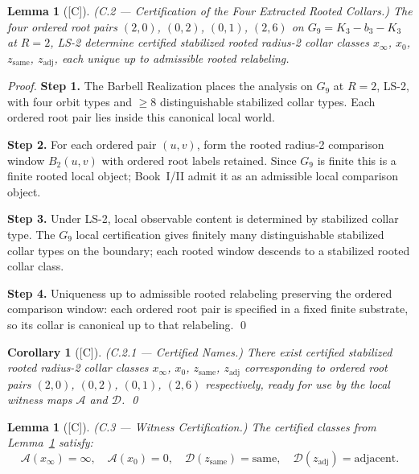 \documentclass[12pt,oneside]{amsbook}
\theoremstyle{plain}
\newtheorem{lemma}[theorem]{Lemma}
\newtheorem{corollary}[theorem]{Corollary}
\theoremstyle{definition}
\theoremstyle{remark}
\newcommand{\status}[1]{\textup{[#1]}}
\begin{document}
\begin{lemma}[\status{C}]\label{lem:C2-collar-cert}
\textup{(C.2 --- Certification of the Four Extracted Rooted Collars.)}
The four ordered root pairs
$(2,0)$, $(0,2)$, $(0,1)$, $(2,6)$
on $G_9 = K_3 - b_3 - K_3$ at $R=2$, LS-2 determine certified
stabilized rooted radius-2 collar classes
$x_\infty$, $x_0$, $z_{\mathrm{same}}$, $z_{\mathrm{adj}}$,
each unique up to admissible rooted relabeling.
\end{lemma}

\begin{proof}
\textbf{Step 1.}  The Barbell Realization places the analysis on
$G_9$ at $R=2$, LS-2, with four orbit types and $\geq 8$
distinguishable stabilized collar types.  Each ordered root pair
lies inside this canonical local world.

\textbf{Step 2.}  For each ordered pair $(u,v)$, form the rooted
radius-2 comparison window $B_2(u,v)$ with ordered root labels
retained.  Since $G_9$ is finite this is a finite rooted local
object; Book~I/II admit it as an admissible local comparison object.

\textbf{Step 3.}  Under LS-2, local observable content is
determined by stabilized collar type.  The $G_9$ local certification
gives finitely many distinguishable stabilized collar types on the
boundary; each rooted window descends to a stabilized rooted collar
class.

\textbf{Step 4.}  Uniqueness up to admissible rooted relabeling
preserving the ordered comparison window: each ordered root pair is
specified in a fixed finite substrate, so its collar is canonical up
to that relabeling. \qed
\end{proof}

\begin{corollary}[\status{C}]\label{cor:C2-certified-names}
\textup{(C.2.1 --- Certified Names.)}
There exist certified stabilized rooted radius-2 collar classes
$x_\infty$, $x_0$, $z_{\mathrm{same}}$, $z_{\mathrm{adj}}$
corresponding to ordered root pairs
$(2,0)$, $(0,2)$, $(0,1)$, $(2,6)$ respectively,
ready for use by the local witness maps $\mathcal{A}$ and
$\mathcal{D}$.  \qed
\end{corollary}

\begin{lemma}[\status{C}]\label{lem:C3-witness-cert}
\textup{(C.3 --- Witness Certification.)}
The certified classes from Lemma~\ref{lem:C2-collar-cert} satisfy:
\[
  \mathcal{A}(x_\infty) = \infty,\quad
  \mathcal{A}(x_0) = 0,\quad
  \mathcal{D}(z_{\mathrm{same}}) = \mathrm{same},\quad
  \mathcal{D}(z_{\mathrm{adj}}) = \mathrm{adjacent}.
\]
\end{lemma}
\end{document}
